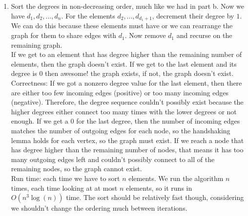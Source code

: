 \documentclass[11pt]{article}
\begin{document}
\begin{enumerate}
\begin{enumerate}
\begin{enumerate}
\end{enumerate}
\item Sort the degrees in non-decreasing order, much like we had in part b. Now we have $d_1,d_2,..., d_n$. For the elements $d_2,..., d_{d_1+1}$, decrement their degree by $1$. We can do this because these elements must have or we can rearrange the graph for them to share edges with $d_1$. Now remove $d_1$ and recurse on the remaining graph.\\
If we get to an element that has degree higher than the remaining number of elements, then the graph doesn't exist. If we get to the last element and its degree is $0$ then awesome! the graph exists, if not, the graph doesn't exist.\\
Correctness: If we got a nonzero degree value for the last element, then there are either too few incoming edges (positive) or too many incoming edges (negative). Therefore, the degree sequence couldn't possibly exist because the higher degrees either connect too many times with the lower degrees or not enough. If we get a $0$ for the last degree, then the number of incoming edges matches the number of outgoing edges for each node, so the handshaking lemma holds for each vertex, so the graph must exist. If we reach a node that has degree higher than the remaining number of nodes, that means it has too many outgoing edges left and couldn't possibly connect to all of the remaining nodes, so the graph cannot exist.\\
Run time: each time we have to sort $n$ elements. We run the algorithm $n$ times, each time looking at at most $n$ elements, so it runs in $O(n^3\log(n))$ time. The sort should be relatively fast though, considering we shouldn't change the ordering much between iterations. 
\end{enumerate}
\end{enumerate}
\end{document}
